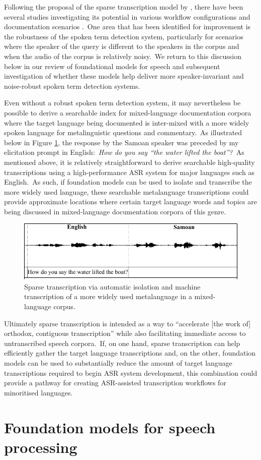 \documentclass[main.tex]{subfiles}
\begin{document}
Following the proposal of the sparse transcription model by \textcite{bird-2020-sparse}, there have been several studies investigating its potential in various workflow configurations and documentation scenarios \parencite{leferrandEnablingInteractiveTranscription2020,le2021phone,le2022learning,lane2022finite,lane2021local}.~One area that has been identified for improvement is the robustness of the spoken term detection system, particularly for scenarios where the speaker of the query is different to the speakers in the corpus and when the audio of the corpus is relatively noisy.~We return to this discussion below in our review of foundational models for speech and subsequent investigation of whether these models help deliver more speaker-invariant and noise-robust spoken term detection systems.

Even without a robust spoken term detection system, it may nevertheless be possible to derive a searchable index for mixed-language documentation corpora where the target language being documented is inter-mixed with a more widely spoken language for metalinguistic questions and commentary.~As illustrated below in Figure \ref{fig:mixed}, the response by the Samoan speaker was preceded by my elicitation prompt in English:~\textit{How do you say ``the water lifted the boat''?}~As mentioned above, it is relatively straightforward to derive searchable high-quality transcriptions using a high-performance ASR system for major languages such as English.~As such, if foundation models can be used to isolate and transcribe the more widely used language, these searchable metalanguage transcriptions could provide approximate locations where certain target language words and topics are being discussed in mixed-language documentation corpora of this genre.

\begin{figure}[t]
  \centering
  \includegraphics[width=0.85\linewidth]{figures/intro-mixed-corpus.pdf}
  \caption{Sparse transcription via automatic isolation and machine transcription of a more widely used metalanguage in a mixed-language corpus.}
  \label{fig:mixed}
\end{figure}

Ultimately sparse transcription is intended as a way to ``accelerate [the work of] orthodox, contiguous transcription'' \parencite[p.~737]{bird-2020-sparse} while also facilitating immediate access to untranscribed speech corpora.~If, on one hand, sparse transcription can help efficiently gather the target language transcriptions and, on the other, foundation models can be used to substantially reduce the amount of target language transcriptions required to begin ASR system development, this combination could provide a pathway for creating ASR-assisted transcription workflows for minoritised languages.

\section{Foundation models for speech processing}
\end{document}
